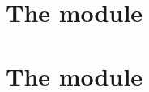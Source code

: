 

\chapter{The \ecDataMod{} module}    \label{chap: ec data}             \minitoc 
\chapter{The \blsMod{} module}       \label{chap: bls data}            \minitoc 
